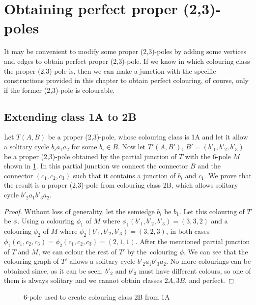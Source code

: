 \section{Obtaining perfect proper (2,3)-poles}\label{sec:classes-to-perfect}

It may be convenient to modify some proper (2,3)-poles by adding some vertices and edges to obtain perfect proper (2,3)-pole. If we know in which colouring class the proper (2,3)-pole is, then we can make a junction with the specific constructions provided in this chapter to obtain perfect colouring, of course, only if the former (2,3)-pole is colourable. 

\subsection{Extending class 1A to 2B}

Let $T(A,B)$ be a proper (2,3)-pole, whose colouring class is 1A and let it allow a solitary cycle $b_ia_1a_2$ for some $b_i\in B$. Now let $T'(A,B')$, $B'=(b'_1, b'_2, b'_3)$ be a proper (2,3)-pole obtained by the partial junction of $T$ with the 6-pole $M$ shown in \cref{fig:1A2B}. In this partial junction we connect the connector $B$ and the connector $(c_1,c_2,c_3)$ such that it contains a junction of $b_i$ and $c_1$. We prove that the result is a proper (2,3)-pole from colouring class 2B, which allows solitary cycle $b'_2a_1b'_3a_2$.

\begin{proof}
	Without loss of generality, let the semiedge $b_i$ be $b_1$. Let this colouring of $T$ be $\phi$. Using a colouring $\phi_1$ of $M$ where $\phi_1(b'_1,b'_2,b'_3)=(3,3,2)$ and a colouring $\phi_2$ of $M$ where $\phi_2(b'_1,b'_2,b'_3)=(3,2,3)$, in both cases $\phi_1(c_1,c_2,c_3)=\phi_2(c_1,c_2,c_3)=(2,1,1)$. After the mentioned partial junction of $T$ and $M$, we can colour the rest of $T'$ by the~colouring $\phi$. We can see that the colouring graph of $T'$ allows a solitary cycle $b'_2a_1b'_3a_2$. No more colourings can be obtained since, as it can be seen, $b'_2$ and $b'_3$ must have different colours, so one of them is always solitary and we cannot obtain classes $2A,3B$, and perfect.
\end{proof}

\begin{figure}
	\centering
	\scalebox{0.7}{
		
	}
	\caption{6-pole used to create colouring class 2B from 1A}
	\label{fig:1A2B}
\end{figure}

